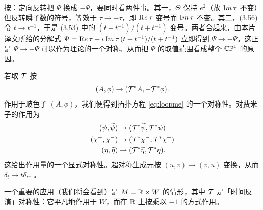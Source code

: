 \begin{yizhu}[含糊点拨]
按：定向反转把 $\Psi$ 换成 $-\Psi$，要同时看两件事。其一，$\Theta$ 保持 $e^2$（故 ${\rm Im}\,\tau$ 不变）但反转瞬子数的符号，等效于 $\tau\to-\bar\tau$，即 ${\rm Re}\,\tau$ 变号而 ${\rm Im}\,\tau$ 不变。其二，(3.56) 令 $t\to t^{-1}$，于是 (3.53) 中的 $(t-t^{-1})/(t+t^{-1})$ 变号。两者合起来，由本片译文所给的分解式 $\Psi={\rm Re}\,\tau+i\,{\rm Im}\,\tau\,(t-t^{-1})/(t+t^{-1})$ 立即得到 $\Psi\to-\Psi$。这正是 $\Psi\to-\Psi$ 可以作为理论的一个对称、从而把 $\Psi$ 的取值范围看成整个 $\Bbb{CP}^1$ 的原因。
\end{yizhu}

若取 ${\EUT}$ 按
\setcounter{equation}{56}
\begin{equation}\label{eq:yoro}
(A,\phi)\to ({\EUT}^*A,-{\EUT}^*\phi).
\end{equation}
作用于玻色子 $(A,\phi)$，我们便得到拓扑方程 \eqref{eq:loopme} 的一个对称性。对费米子的作用为%
\setcounter{equation}{57}
\begin{equation}\label{eq:zoro}
\begin{aligned}(\psi,\tilde\psi)&\to
({\EUT}^*\tilde\psi,{\EUT}^*\psi)\\ (\chi^+,\chi^-)&\to
({\EUT}^*\chi^-,{\EUT}^*\chi^+)\\ (\eta,\tilde\eta)&\to
({\EUT}^*\tilde\eta,{\EUT}^*\eta).\\\end{aligned}
\end{equation}
这给出作用量的一个显式对称性。超对称生成元按 $(u,v)\to(v,u)$ 变换，从而 $\delta_t\to t\delta_{t^{-1}}$。

一个重要的应用（我们将会看到）是 $M=\Bbb{R}\times W$ 的情形，其中 ${\EUT}$ 是「时间反演」对称性：它平凡地作用于 $W$，而在 $\Bbb{R}$ 上按乘以 $-1$ 的方式作用。
